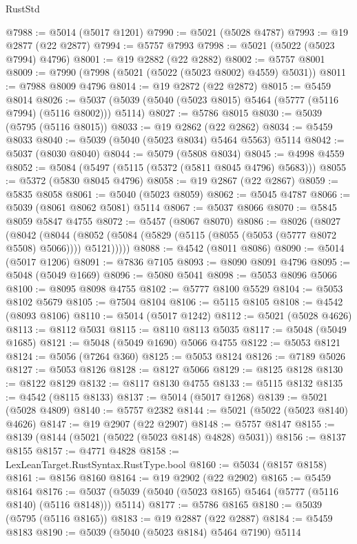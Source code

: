 \begin{lexlean}{RustStd}
\begin{coremodule}
@7988 := @5014 (@5017 @1201)
@7990 := @5021 (@5028 @4787)
@7993 := @19 @2877 (@22 @2877)
@7994 := @5757 @7993
@7998 := @5021 (@5022 (@5023 @7994) @4796)
@8001 := @19 @2882 (@22 @2882)
@8002 := @5757 @8001
@8009 := @7990 (@7998 (@5021 (@5022 (@5023 @8002) @4559) @5031))
@8011 := @7988 @8009 @4796
@8014 := @19 @2872 (@22 @2872)
@8015 := @5459 @8014
@8026 := @5037 (@5039 (@5040 (@5023 @8015) @5464 (@5777 (@5116 @7994) (@5116 @8002))) @5114)
@8027 := @5786 @8015
@8030 := @5039 (@5795 (@5116 @8015))
@8033 := @19 @2862 (@22 @2862)
@8034 := @5459 @8033
@8040 := @5039 (@5040 (@5023 @8034) @5464 @5563) @5114
@8042 := @5037 (@8030 @8040)
@8044 := @5079 (@5808 @8034)
@8045 := @4998 @4559
@8052 := @5084 (@5497 (@5115 (@5372 (@5811 @8045 @4796) @5683)))
@8055 := @5372 (@5830 @8045 @4796)
@8058 := @19 @2867 (@22 @2867)
@8059 := @5835 @8058
@8061 := @5040 (@5023 @8059)
@8062 := @5045 @4787
@8066 := @5039 (@8061 @8062 @5081) @5114
@8067 := @5037 @8066
@8070 := @5845 @8059 @5847 @4755
@8072 := @5457 (@8067 @8070)
@8086 := @8026
    (@8027
      (@8042
        (@8044 (@8052 (@5084 (@5829 (@5115 (@8055 (@5053 (@5777 @8072 @5508) @5066)))) @5121)))))
@8088 := @4542 (@8011 @8086)
@8090 := @5014 (@5017 @1206)
@8091 := @7836 @7105
@8093 := @8090 @8091 @4796
@8095 := @5048 (@5049 @1669)
@8096 := @5080 @5041
@8098 := @5053 @8096 @5066
@8100 := @8095 @8098 @4755
@8102 := @5777 @8100 @5529
@8104 := @5053 @8102 @5679
@8105 := @7504 @8104
@8106 := @5115 @8105
@8108 := @4542 (@8093 @8106)
@8110 := @5014 (@5017 @1242)
@8112 := @5021 (@5028 @4626)
@8113 := @8112 @5031
@8115 := @8110 @8113 @5035
@8117 := @5048 (@5049 @1685)
@8121 := @5048 (@5049 @1690) @5066 @4755
@8122 := @5053 @8121
@8124 := @5056 (@7264 @360)
@8125 := @5053 @8124
@8126 := @7189 @5026
@8127 := @5053 @8126
@8128 := @8127 @5066
@8129 := @8125 @8128
@8130 := @8122 @8129
@8132 := @8117 @8130 @4755
@8133 := @5115 @8132
@8135 := @4542 (@8115 @8133)
@8137 := @5014 (@5017 @1268)
@8139 := @5021 (@5028 @4809)
@8140 := @5757 @2382
@8144 := @5021 (@5022 (@5023 @8140) @4626)
@8147 := @19 @2907 (@22 @2907)
@8148 := @5757 @8147
@8155 := @8139 (@8144 (@5021 (@5022 (@5023 @8148) @4828) @5031))
@8156 := @8137 @8155
@8157 := @4771 @4828
@8158 := LexLeanTarget.RustSyntax.RustType.bool
@8160 := @5034 (@8157 @8158)
@8161 := @8156 @8160
@8164 := @19 @2902 (@22 @2902)
@8165 := @5459 @8164
@8176 := @5037 (@5039 (@5040 (@5023 @8165) @5464 (@5777 (@5116 @8140) (@5116 @8148))) @5114)
@8177 := @5786 @8165
@8180 := @5039 (@5795 (@5116 @8165))
@8183 := @19 @2887 (@22 @2887)
@8184 := @5459 @8183
@8190 := @5039 (@5040 (@5023 @8184) @5464 @7190) @5114

\end{coremodule}
\end{lexlean}

